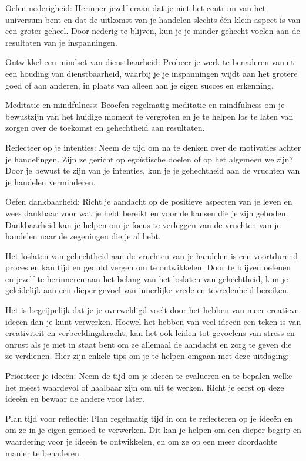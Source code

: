 Oefen nederigheid: Herinner jezelf eraan dat je niet het centrum van het universum bent en dat de uitkomst van je handelen slechts één klein aspect is van een groter geheel. Door nederig te blijven, kun je je minder gehecht voelen aan de resultaten van je inspanningen.

Ontwikkel een mindset van dienstbaarheid: Probeer je werk te benaderen vanuit een houding van dienstbaarheid, waarbij je je inspanningen wijdt aan het grotere goed of aan anderen, in plaats van alleen aan je eigen succes en erkenning.

Meditatie en mindfulness: Beoefen regelmatig meditatie en mindfulness om je bewustzijn van het huidige moment te vergroten en je te helpen los te laten van zorgen over de toekomst en gehechtheid aan resultaten.

Reflecteer op je intenties: Neem de tijd om na te denken over de motivaties achter je handelingen. Zijn ze gericht op egoïstische doelen of op het algemeen welzijn? Door je bewust te zijn van je intenties, kun je je gehechtheid aan de vruchten van je handelen verminderen.

Oefen dankbaarheid: Richt je aandacht op de positieve aspecten van je leven en wees dankbaar voor wat je hebt bereikt en voor de kansen die je zijn geboden. Dankbaarheid kan je helpen om je focus te verleggen van de vruchten van je handelen naar de zegeningen die je al hebt.

Het loslaten van gehechtheid aan de vruchten van je handelen is een voortdurend proces en kan tijd en geduld vergen om te ontwikkelen. Door te blijven oefenen en jezelf te herinneren aan het belang van het loslaten van gehechtheid, kun je geleidelijk aan een dieper gevoel van innerlijke vrede en tevredenheid bereiken.

Het is begrijpelijk dat je je overweldigd voelt door het hebben van meer creatieve ideeën dan je kunt verwerken. Hoewel het hebben van veel ideeën een teken is van creativiteit en verbeeldingskracht, kan het ook leiden tot gevoelens van stress en onrust als je niet in staat bent om ze allemaal de aandacht en zorg te geven die ze verdienen. Hier zijn enkele tips om je te helpen omgaan met deze uitdaging:

Prioriteer je ideeën: Neem de tijd om je ideeën te evalueren en te bepalen welke het meest waardevol of haalbaar zijn om uit te werken. Richt je eerst op deze ideeën en bewaar de andere voor later.

Plan tijd voor reflectie: Plan regelmatig tijd in om te reflecteren op je ideeën en om ze in je eigen gemoed te verwerken. Dit kan je helpen om een dieper begrip en waardering voor je ideeën te ontwikkelen, en om ze op een meer doordachte manier te benaderen.

